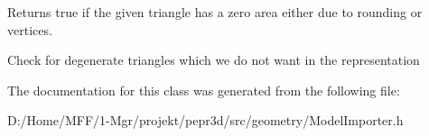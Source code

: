 Returns true if the given triangle has a zero area either due to rounding or vertices. 

Check for degenerate triangles which we do not want in the representation 

The documentation for this class was generated from the following file\+:\begin{DoxyCompactItemize}
\item 
D\+:/\+Home/\+M\+F\+F/1-\/\+Mgr/projekt/pepr3d/src/geometry/Model\+Importer.\+h\end{DoxyCompactItemize}
